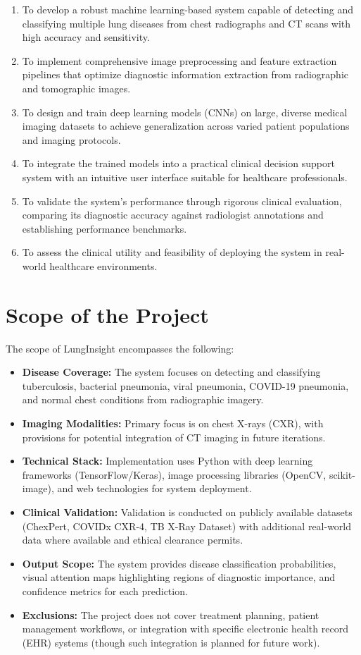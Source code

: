 {\begin{enumerate}
    \item To develop a robust machine learning-based system capable of detecting and classifying multiple lung diseases from chest radiographs and CT scans with high accuracy and sensitivity.
    \item To implement comprehensive image preprocessing and feature extraction pipelines that optimize diagnostic information extraction from radiographic and tomographic images.
    \item To design and train deep learning models (CNNs) on large, diverse medical imaging datasets to achieve generalization across varied patient populations and imaging protocols.
    \item To integrate the trained models into a practical clinical decision support system with an intuitive user interface suitable for healthcare professionals.
    \item To validate the system's performance through rigorous clinical evaluation, comparing its diagnostic accuracy against radiologist annotations and establishing performance benchmarks.
    \item To assess the clinical utility and feasibility of deploying the system in real-world healthcare environments.
\end{enumerate}

\section{Scope of the Project}

The scope of LungInsight encompasses the following:

\begin{itemize}
    \item \textbf{Disease Coverage:} The system focuses on detecting and classifying tuberculosis, bacterial pneumonia, viral pneumonia, COVID-19 pneumonia, and normal chest conditions from radiographic imagery.
    \item \textbf{Imaging Modalities:} Primary focus is on chest X-rays (CXR), with provisions for potential integration of CT imaging in future iterations.
    \item \textbf{Technical Stack:} Implementation uses Python with deep learning frameworks (TensorFlow/Keras), image processing libraries (OpenCV, scikit-image), and web technologies for system deployment.
    \item \textbf{Clinical Validation:} Validation is conducted on publicly available datasets (ChexPert, COVIDx CXR-4, TB X-Ray Dataset) with additional real-world data where available and ethical clearance permits.
    \item \textbf{Output Scope:} The system provides disease classification probabilities, visual attention maps highlighting regions of diagnostic importance, and confidence metrics for each prediction.
    \item \textbf{Exclusions:} The project does not cover treatment planning, patient management workflows, or integration with specific electronic health record (EHR) systems (though such integration is planned for future work).
\end{itemize}

}
